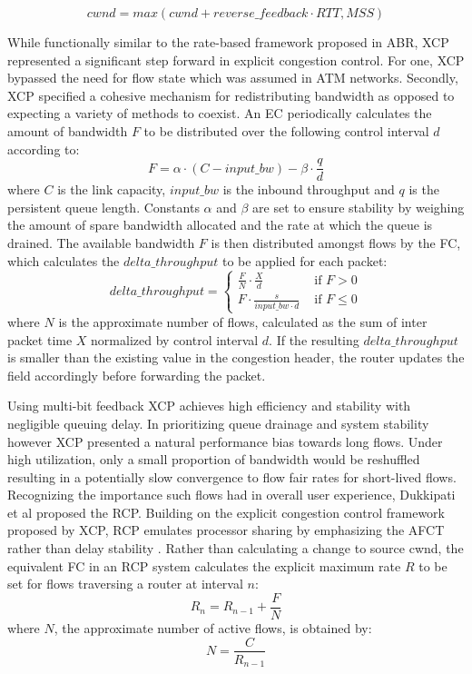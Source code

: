 \begin{equation}
cwnd = max\left (  cwnd + reverse\_feedback \cdot RTT, MSS\right )
\label{eqn:xcpcwnd}
\end{equation}


While functionally similar to the rate-based framework proposed in \ac{ABR}, \ac{XCP} represented a significant step forward in explicit congestion control.
For one, \ac{XCP} bypassed the need for flow state which was assumed in \ac{ATM} networks.
Secondly, \ac{XCP} specified a cohesive mechanism for redistributing bandwidth as opposed to expecting a variety of methods to coexist.
An \ac{EC} periodically calculates the amount of bandwidth $F$ to be distributed over the following control interval $d$ according to:
\begin{equation}
F=\alpha\cdot\left ( C - input\_bw \right ) - \beta\cdot\frac{q}{d}
\label{eqn:ec}
\end{equation}
where $C$ is the link capacity, $input\_bw$ is the inbound throughput and $q$ is the persistent queue length.
Constants $\alpha$ and $\beta$ are set to ensure stability by weighing the amount of spare bandwidth allocated and the rate at which the queue is drained.
The available bandwidth $F$ is then distributed amongst flows by the \ac{FC}, which calculates the $delta\_throughput$ to be applied for each packet:
\begin{equation}
delta\_throughput = \begin{cases}
\frac{F}{N} \cdot \frac{X}{d} & \text{ if } F> 0 \\ 
F \cdot \frac{s}{input\_bw \cdot d} & \text{ if } F\leq 0 
\end{cases}
\end{equation}
where $N$ is the approximate number of flows, calculated as the sum of inter packet time $X$ normalized by control interval $d$.
If the resulting $delta\_throughput$ is smaller than the existing value in the congestion header, the router updates the field accordingly before forwarding the packet.

Using multi-bit feedback \ac{XCP} achieves high efficiency and stability with negligible queuing delay.
In prioritizing queue drainage and system stability however \ac{XCP} presented a natural performance bias towards long flows.
Under high utilization, only a small proportion of bandwidth would be reshuffled resulting in a potentially slow convergence to flow fair rates for short-lived flows.
Recognizing the importance such flows had in overall user experience, Dukkipati et al proposed the \ac{RCP}.
Building on the explicit congestion control framework proposed by \ac{XCP}, \ac{RCP} emulates processor sharing by emphasizing the \ac{AFCT} rather than delay stability \cite{Dukkipati:2005p78}.
Rather than calculating a change to source \ac{cwnd}, the equivalent \ac{FC} in an \ac{RCP} system calculates the explicit maximum rate $R$ to be set for flows traversing a router at interval $n$:
\begin{equation}
R_n = R_{n-1} + \frac{F}{N}
\end{equation}
where $N$, the approximate number of active flows, is obtained by:
\begin{equation}
N = \frac{C}{R_{n-1}}
\end{equation}

